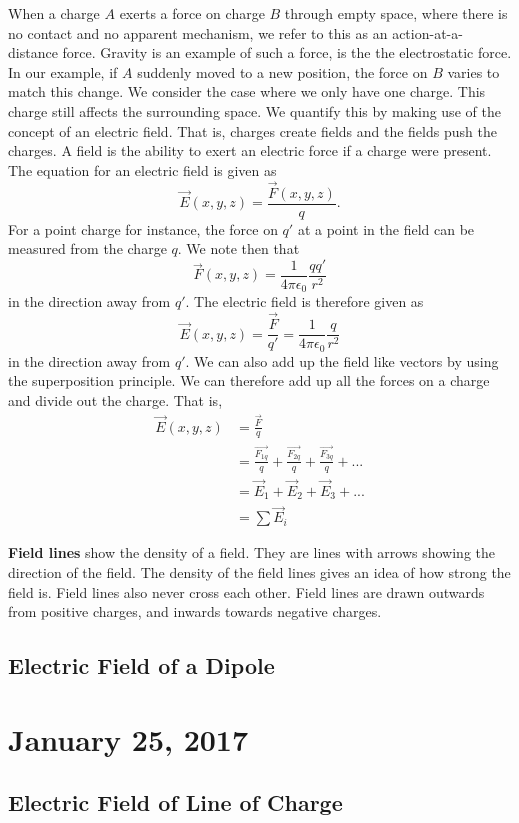 \documentclass[11pt]{article}
\theoremstyle{plain} %
\theoremstyle{definition}
\theoremstyle{example}
\theoremstyle{remark}
\begin{document}
When a charge $A$ exerts a force on charge $B$ through empty space, where there is no contact and no apparent mechanism, we refer to this as an action-at-a-distance force. Gravity is an example of such a force, is the the electrostatic force. In our example, if $A$ suddenly moved to a new position, the force on $B$ varies to match this change. We consider the case where we only have one charge. This charge still affects the surrounding space. We quantify this by making use of the concept of an electric field. That is, charges create fields and the fields push the charges. A field is the ability to exert an electric force if a charge were present. The equation for an electric field is given as 
$$\vec{E}(x,y,z) = \frac{\vec{F}(x,y,z)}{q}.$$
For a point charge for instance, the force on $q'$ at a point in the field can be measured from the charge $q$. We note then that $$\vec{F}(x,y,z) = \frac{1}{4\pi\epsilon_0}\frac{qq'}{r^2}$$ in the direction away from $q'$. The electric field is therefore given as $$\vec{E}(x,y,z) = \frac{\vec{F}}{q'} = \frac{1}{4\pi\epsilon_0}\frac{q}{r^2}$$ in the direction away from $q'$. We can also add up the field like vectors by using the superposition principle. We can therefore add up all the forces on a charge and divide out the charge. That is, 
\begin{align*}
\vec{E}(x,y,z) &= \frac{\vec{F}}{q}\\
&= \frac{\vec{F_{1q}}}{q} + \frac{\vec{F_{2q}}}{q} +\frac{\vec{F_{3q}}}{q} +...\\
&= \vec{E}_1 + \vec{E}_2 + \vec{E}_3+...\\
&= \sum\vec{E}_i
\end{align*}

\textbf{Field lines} show the density of a field. They are lines with arrows showing the direction of the field. The density of the field lines gives an idea of how strong the field is. Field lines also never cross each other. Field lines are drawn outwards from positive charges, and inwards towards negative charges. 

\subsection{Electric Field of a Dipole}




\section{January 25, 2017}
\subsection{Electric Field of Line of Charge}
\end{document}
